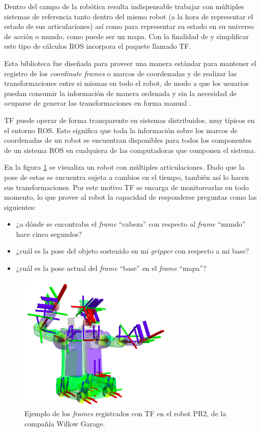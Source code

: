 Dentro del campo de la robótica resulta indispensable trabajar con múltiples sistemas de referencia tanto dentro del mismo robot (a la hora de representar el estado de sus articulaciones) así como para representar su estado en su universo de acción o mundo, como puede ser un mapa. Con la finalidad de y simplificar este tipo de cálculos ROS incorpora el paquete llamado TF.

Esta biblioteca fue diseñada para proveer una manera estándar para mantener el registro de los \textit{coordinate frames} o marcos de coordenadas y de realizar las transformaciones entre si mismas en todo el robot, de modo a que los usuarios puedan consumir la información de manera ordenada y sin la necesidad de ocuparse de generar las transformaciones en forma manual \citep{PAPER:3}.

TF puede operar de forma transparente en sistemas distribuidos, muy típicos en el entorno ROS. Esto significa que toda la información sobre los marcos de coordenadas de un robot se encuentran disponibles para todos los componentes de un sistema ROS en cualquiera de las computadoras que componen el sistema.

En la figura \ref{fig:tf} se visualiza un robot con múltiples articulaciones. Dado que la pose de estas se encuentra sujeta a cambios en el tiempo, también así lo hacen sus transformaciones. Por este motivo TF se encarga de monitorearlas en todo momento, lo que provee al robot la capacidad de responderse preguntas como las siguientes:

\begin{itemize}
    \item ¿a dónde se encontraba el \textit{frame} ``cabeza'' con respecto al \textit{frame} ``mundo'' hace cinco segundos?
    \item ¿cuál es la pose del objeto sostenido en mi \textit{gripper} con respecto a mi base?
    \item ¿cuál es la pose actual del \textit{frame} ``base'' en el \textit{frame} ``mapa''?
\end{itemize}


\begin{figure}[ht]
    \centering
    \includegraphics[scale=0.8]{./Figures/tf.png}
    \caption{Ejemplo de los \textit{frames} registrados con TF en el robot PR2, de la compañía Willow Garage.\protect\footnotemark}
    \label{fig:tf}
\end{figure}

